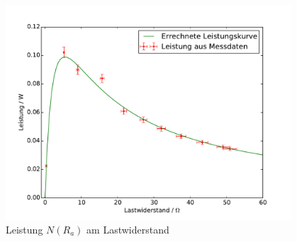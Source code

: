 \begin{figure}[h!]
	\centering
	\includegraphics[width=0.95\textwidth]{Leistungskurve.pdf}
	\caption{Leistung $N(R_a)$ am Lastwiderstand}
	\label{fig:Werte_Leistung}
\end{figure}



